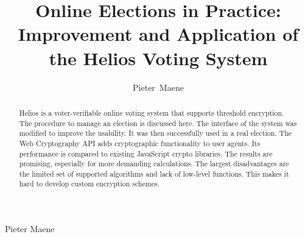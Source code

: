 \documentclass[a4paper,journal]{IEEEtran}
\begin{document}
  

  \title{Online Elections in Practice: Improvement and Application of the Helios Voting System}
  \author{Pieter~Maene}

  \maketitle
  
  \begin{abstract}
    Helios is a voter-verifiable online voting system that supports threshold encryption. The procedure to manage an election is discussed here. The interface of the system was modified to improve the usability. It was then successfully used in a real election. The Web Cryptography API adds cryptographic functionality to user agents. Its performance is compared to existing JavaScript crypto libraries. The results are promising, especially for more demanding calculations. The largest disadvantages are the limited set of supported algorithms and lack of low-level functions. This makes it hard to develop custom encryption schemes.
  \end{abstract}
  
  
  
  
  
  
  
  
  
  

  \begin{IEEEbiography}{Pieter Maene}
  \end{IEEEbiography}
\end{document}
